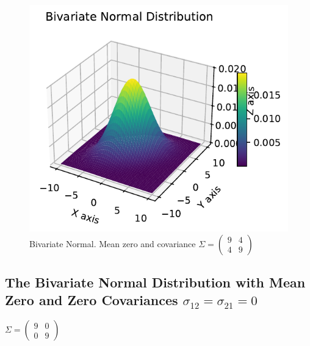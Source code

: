 \documentclass[
  letterpaper,
  DIV=11,
  numbers=noendperiod]{scrreprt}
\begin{document}
\begin{figure}[H]

{\centering \includegraphics{006_num_gp_files/figure-pdf/fig-bi90403d-output-1.pdf}

}

\caption{\label{fig-bi90403d}Bivariate Normal. Mean zero and covariance
\(\Sigma=\begin{pmatrix} 9 & 4 \\ 4 & 9\end{pmatrix}\)}

\end{figure}

\hypertarget{the-bivariate-normal-distribution-with-mean-zero-and-zero-covariances-sigma_12-sigma_21-0}{%
\subsection{\texorpdfstring{The Bivariate Normal Distribution with Mean
Zero and Zero Covariances
\(\sigma_{12} = \sigma_{21} = 0\)}{The Bivariate Normal Distribution with Mean Zero and Zero Covariances \textbackslash sigma\_\{12\} = \textbackslash sigma\_\{21\} = 0}}\label{the-bivariate-normal-distribution-with-mean-zero-and-zero-covariances-sigma_12-sigma_21-0}}

\(\Sigma=\begin{pmatrix} 9 & 0 \\ 0 & 9\end{pmatrix}\)
\end{document}
